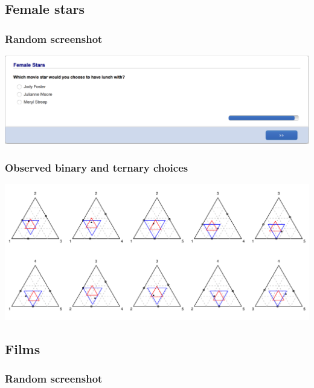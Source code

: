 \documentclass[11pt,letter]{article}
\begin{document}
\pagebreak

\subsection{Female stars}



\subsubsection*{Random screenshot}

\includegraphics[width=15cm]{Population_study_design/screenshot_Female_Stars.png}

\subsubsection*{Observed binary and ternary choices}

\includegraphics[width=15cm]{./Population_study_data/Simplexes/Female_stars.pdf}

\pagebreak

\subsection{Films}



\subsubsection*{Random screenshot}
\end{document}
